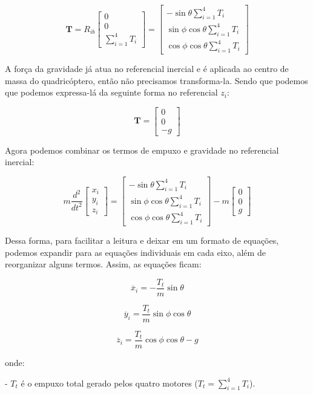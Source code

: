 \[
\mathbf{T} = R_{ib} \begin{bmatrix} 
0 \\
0 \\
\sum_{i=1}^{4} T_i 
\end{bmatrix} = 
\begin{bmatrix} 
-\sin\theta \sum_{i=1}^{4} T_i \\
\sin\phi \cos\theta \sum_{i=1}^{4} T_i \\
\cos\phi \cos\theta \sum_{i=1}^{4} T_i
\end{bmatrix}
\]

A força da gravidade já atua no referencial inercial e é aplicada ao centro de massa do quadricóptero, então não precisamos transforma-la. Sendo que podemos que podemos expressa-lá da seguinte forma no referencial $z_i$:

\[
\mathbf{T} = \begin{bmatrix}
0 \\
0 \\
-g
\end{bmatrix}
\]

Agora podemos combinar os termos de empuxo e gravidade no referencial inercial:

\[
m \frac{d^2}{dt^2} \begin{bmatrix} 
x_i \\ 
y_i \\ 
z_i 
\end{bmatrix}
=
\begin{bmatrix} 
-\sin\theta \sum_{i=1}^{4} T_i \\
\sin\phi \cos\theta \sum_{i=1}^{4} T_i \\
\cos\phi \cos\theta \sum_{i=1}^{4} T_i
\end{bmatrix}
- m \begin{bmatrix}
0 \\
0 \\
g
\end{bmatrix}
\]

Dessa forma, para facilitar a leitura e deixar em um formato de equações, podemos expandir para as equações individuais em cada eixo, além de reorganizar alguns termos. Assim, as equações ficam:


\[
\ddot{x_i} = -\frac{T_t}{m} \sin\theta
\]

\[
\ddot{y_i} = \frac{T_t}{m} \sin\phi \cos\theta
\]

\[
\ddot{z_i} = \frac{T_t}{m} \cos\phi \cos\theta - g
\]

onde:

- \(T_t\) é o empuxo total gerado pelos quatro motores (\(T_t = \sum_{i=1}^{4} T_i\)).


